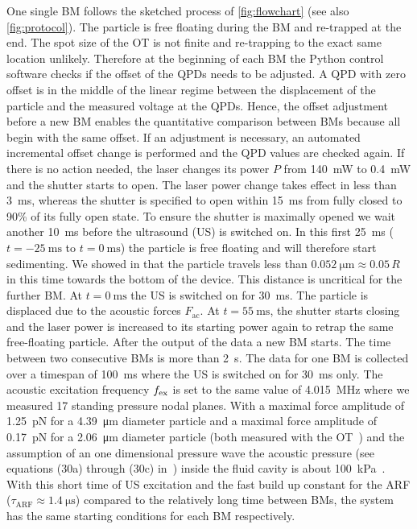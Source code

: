 One single BM follows the sketched process of \cref{fig:flowchart} (see also 
\cref{fig:protocol}). The particle is free floating during the BM and 
re-trapped at the end. The spot size of the OT is not finite and re-trapping to 
the exact same location unlikely. Therefore at the beginning of each BM the 
Python control software checks if the offset of the QPDs needs to be adjusted. 
A QPD with zero offset is in the middle of the linear regime between the 
displacement of the particle and the measured voltage at the QPDs. Hence, the 
offset adjustment before a new BM enables the quantitative comparison between 
BMs because all begin with the same offset. If an adjustment is necessary, an 
automated incremental offset change is performed and the QPD values are checked 
again. If there is no action needed, the laser changes its power $P$ from 
\SI{140}{\milli\watt} to \SI{0.4}{\milli\watt} and the shutter starts to open. 
The laser power change takes effect in less than \SI{3}{\ms}, whereas the 
shutter is specified to open within \SI{15}{\ms} from fully closed to 90\% of 
its fully open state. To ensure the shutter is maximally opened we wait another 
\SI{10}{\ms} before the ultrasound (US) is switched on. In this first 
\SI{25}{\ms} ($t=\SI{-25}{\ms}$ to $t=\SI{0}{\ms}$) the particle is free 
floating and will therefore start sedimenting. We showed in \cite{Goering2021} 
that the particle travels less than $\SI{0.052}{\um}\approx 0.05\,R$ in this 
time towards the bottom of the device. This distance is uncritical for the 
further BM. At $t=\SI{0}{\ms}$ the US is switched on for \SI{30}{\ms}. The 
particle is displaced due to the acoustic forces $F_{\mathrm{ac}}$. At 
$t=\SI{55}{\ms}$, the shutter starts closing and the laser power is increased 
to its starting power again to retrap the same free-floating particle. After 
the output of the data a new BM starts. The time between two consecutive BMs 
is more than \SI{2}{\s}. The data for one BM is collected over a timespan of 
\SI{100}{\ms} where the US is switched on for \SI{30}{\ms} only. The acoustic 
excitation frequency $f_{\mathrm{ex}}$ is set to the same value of \SI{4.015}{\mega\hertz} 
where we measured 17 standing pressure nodal planes. With a maximal force 
amplitude of \SI{1.25}{\pico\newton} for a \SI{4.39}{\um} diameter particle and 
a maximal force amplitude of \SI{0.17}{\pico\newton} for a \SI{2.06}{\um} 
diameter particle (both measured with the OT~\cite{Goering2021}) and the 
assumption of an one dimensional pressure wave the acoustic pressure (see 
equations (30a) through (30c) in~\cite{Bruus2012}) inside the fluid cavity is 
about \SI{100}{\kilo\pascal}~\cite{Goering2021}. With this short time of US 
excitation and the fast build up constant for the ARF 
($\tau_{\mathrm{ARF}}\approx \SI{1.4}{\us}$) compared to the relatively long 
time between BMs, the system has the same starting conditions for each BM 
respectively.

